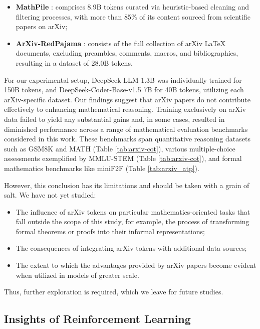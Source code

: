 \begin{itemize}[topsep=0pt]
\begin{itemize}[topsep=0pt]
\begin{itemize}[topsep=0pt]
    \item \textbf{MathPile} \citep{mathpile}: comprises 8.9B tokens curated via heuristic-based cleaning and filtering processes, with more than 85\% of its content sourced from scientific papers on arXiv;
    \item \textbf{ArXiv-RedPajama} \citep{redpajama}: consists of the full collection of arXiv LaTeX documents, excluding preambles, comments, macros, and bibliographies, resulting in a dataset of 28.0B tokens.
\end{itemize}

For our experimental setup, DeepSeek-LLM 1.3B was individually trained for 150B tokens, and DeepSeek-Coder-Base-v1.5 7B for 40B tokens, utilizing each arXiv-specific dataset. Our findings suggest that arXiv papers do not contribute effectively to enhancing mathematical reasoning. Training exclusively on arXiv data failed to yield any substantial gains and, in some cases, resulted in diminished performance across a range of mathematical evaluation benchmarks considered in this work. These benchmarks span quantitative reasoning datasets such as GSM8K and MATH (Table \ref{tab:arxiv-cot}), various multiple-choice assessments exemplified by MMLU-STEM (Table \ref{tab:arxiv-cot}), and formal mathematics benchmarks like miniF2F (Table \ref{tab:arxiv_atp}).

However, this conclusion has its limitations and should be taken with a grain of salt. We have not yet studied:

\begin{itemize}[topsep=0pt]
    \item The influence of arXiv tokens on particular mathematics-oriented tasks that fall outside the scope of this study, for example, the process of transforming formal theorems or proofs into their informal representations;
    \item The consequences of integrating arXiv tokens with additional data sources;
    \item The extent to which the advantages provided by arXiv papers become evident when utilized in models of greater scale.
\end{itemize}

Thus, further exploration is required, which we leave for future studies.

\subsection{Insights of Reinforcement Learning}

\end{itemize}
\end{itemize}
